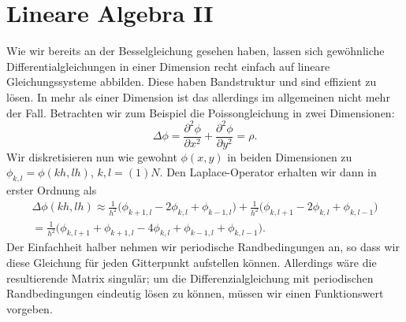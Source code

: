 % 

\chapter{Lineare Algebra \textrm{II}}

Wie wir bereits an der Besselgleichung gesehen haben, lassen sich
gewöhnliche Differentialgleichungen in einer Dimension recht einfach
auf lineare Gleichungssysteme abbilden. Diese haben Bandstruktur und
sind effizient zu lösen.  In mehr als einer Dimension ist das
allerdings im allgemeinen nicht mehr der Fall. Betrachten wir zum
Beispiel die Poissongleichung in zwei Dimensionen:
\begin{equation}
  \label{eq:laplace}
  \Delta \phi = \frac{\partial^2 \phi}{\partial x^2} +
  \frac{\partial^2 \phi}{\partial y^2} = \rho.
\end{equation}
Wir diskretisieren nun wie gewohnt $\phi(x,y)$ in beiden Dimensionen
zu $\phi_{k, l} = \phi(k h, l h)$, $k,l=(1)N$. Den Laplace-Operator
erhalten wir dann in erster Ordnung als
\begin{align}
  \label{eq:laplacedisc}
  \Delta \phi(k h, l h) \approx
  \frac{1}{h^2}\bigl(\phi_{k+1,l} -
  2\phi_{k,l}  + \phi_{k-1,l}\bigr) + 
  \frac{1}{h^2}\bigl(\phi_{k,l+1} -
  2\phi_{k,l}  + \phi_{k,l-1}\bigr)\nonumber\\
  = \frac{1}{h^2}\bigl(
  \phi_{k,l+1} + \phi_{k+1,l} - 4\phi_{k,l} +
  \phi_{k-1,l} + \phi_{k,l-1}\bigr).
\end{align}
Der Einfachheit halber nehmen wir periodische Randbedingungen an, so
dass wir diese Gleichung für jeden Gitterpunkt aufstellen
können. Allerdings wäre die resultierende Matrix singulär; um die
Differenzialgleichung mit periodischen Randbedingungen eindeutig lösen
zu können, müssen wir einen Funktionswert vorgeben.

